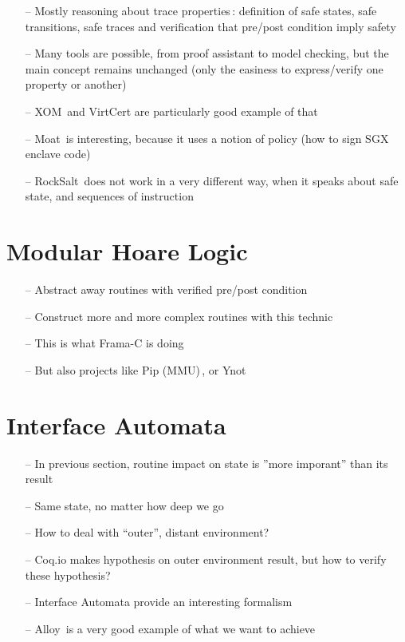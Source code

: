 \begin{itemize}
\item[--] Mostly reasoning about trace
  properties\,\cite{schneider2000enforceable}: definition of safe states, safe
  transitions, safe traces and verification that pre/post condition imply safety
\item[--] Many tools are possible, from proof assistant to model checking, but
  the main concept remains unchanged (only the easiness to express/verify one
  property or another)
\item[--] XOM\,\cite{lie2003xom} and VirtCert are particularly good example of
  that
\item[--] Moat\,\cite{sinha2015moat} is interesting, because it uses a notion of
  policy (how to sign SGX enclave code)
\item[--] RockSalt\,\cite{morrisett2012rocksalt} does not work in a very
  different way, when it speaks about safe state, and sequences of instruction
\end{itemize}

\section{Modular Hoare Logic} %

\begin{itemize}
\item[--] Abstract away routines with verified pre/post condition
\item[--] Construct more and more complex routines with this technic
\item[--] This is what Frama-C is doing
\item[--] But also projects like Pip (MMU)\,\cite{jomaa2016mmu}, or Ynot
\end{itemize}

\section{Interface Automata} %

\begin{itemize}
\item[--] In previous section, routine impact on state is ''more imporant'' than
  its result
\item[--] Same state, no matter how deep we go
\item[--] How to deal with ``outer'', distant environment?
\item[--] Coq.io makes hypothesis on outer environment result, but how to verify
  these hypothesis?
\item[--] Interface Automata provide an interesting formalism
\item[--] Alloy\,\cite{jackson2012alloy} is a very good example of what we want
  to achieve
\end{itemize}

